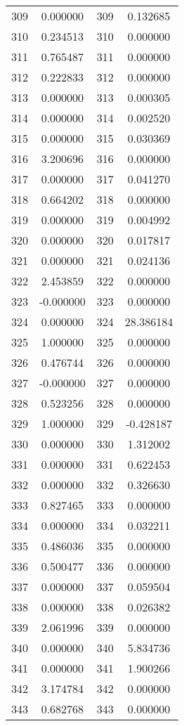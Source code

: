 \documentclass[12pt]{article}
\begin{document}
\begin{longtable}{@{}cccc@{}}
309 & 0.000000 & 309 & 0.132685 \\
310 & 0.234513 & 310 & 0.000000 \\
311 & 0.765487 & 311 & 0.000000 \\
312 & 0.222833 & 312 & 0.000000 \\
313 & 0.000000 & 313 & 0.000305 \\
314 & 0.000000 & 314 & 0.002520 \\
315 & 0.000000 & 315 & 0.030369 \\
316 & 3.200696 & 316 & 0.000000 \\
317 & 0.000000 & 317 & 0.041270 \\
318 & 0.664202 & 318 & 0.000000 \\
319 & 0.000000 & 319 & 0.004992 \\
320 & 0.000000 & 320 & 0.017817 \\
321 & 0.000000 & 321 & 0.024136 \\
322 & 2.453859 & 322 & 0.000000 \\
323 & -0.000000 & 323 & 0.000000 \\
324 & 0.000000 & 324 & 28.386184 \\
325 & 1.000000 & 325 & 0.000000 \\
326 & 0.476744 & 326 & 0.000000 \\
327 & -0.000000 & 327 & 0.000000 \\
328 & 0.523256 & 328 & 0.000000 \\
329 & 1.000000 & 329 & -0.428187 \\
330 & 0.000000 & 330 & 1.312002 \\
331 & 0.000000 & 331 & 0.622453 \\
332 & 0.000000 & 332 & 0.326630 \\
333 & 0.827465 & 333 & 0.000000 \\
334 & 0.000000 & 334 & 0.032211 \\
335 & 0.486036 & 335 & 0.000000 \\
336 & 0.500477 & 336 & 0.000000 \\
337 & 0.000000 & 337 & 0.059504 \\
338 & 0.000000 & 338 & 0.026382 \\
339 & 2.061996 & 339 & 0.000000 \\
340 & 0.000000 & 340 & 5.834736 \\
341 & 0.000000 & 341 & 1.900266 \\
342 & 3.174784 & 342 & 0.000000 \\
343 & 0.682768 & 343 & 0.000000 \\

\end{longtable}
\end{document}
